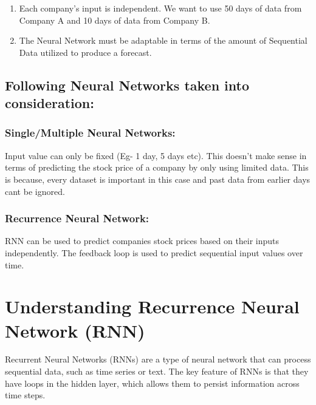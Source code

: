\documentclass[
]{article}
\providecommand{\tightlist}{%
  \setlength{\itemsep}{0pt}\setlength{\parskip}{0pt}}
\begin{document}
\begin{enumerate}
\def\labelenumi{\arabic{enumi}.}
\tightlist
\item
  Each company's input is independent. We want to use 50 days of data
  from Company A and 10 days of data from Company B.
\item
  The Neural Network must be adaptable in terms of the amount of
  Sequential Data utilized to produce a forecast.
\end{enumerate}

\hypertarget{following-neural-networks-taken-into-consideration}{%
\subsection{Following Neural Networks taken into
consideration:}\label{following-neural-networks-taken-into-consideration}}

\hypertarget{singlemultiple-neural-networks}{%
\subsubsection{Single/Multiple Neural
Networks:}\label{singlemultiple-neural-networks}}

Input value can only be fixed (Eg- 1 day, 5 days etc). This doesn't make
sense in terms of predicting the stock price of a company by only using
limited data. This is because, every dataset is important in this case
and past data from earlier days cant be ignored.

\hypertarget{recurrence-neural-network}{%
\subsubsection{Recurrence Neural
Network:}\label{recurrence-neural-network}}

RNN can be used to predict companies stock prices based on their inputs
independently. The feedback loop is used to predict sequential input
values over time.

\hypertarget{understanding-recurrence-neural-network-rnn}{%
\section{Understanding Recurrence Neural Network
(RNN)}\label{understanding-recurrence-neural-network-rnn}}

Recurrent Neural Networks (RNNs) are a type of neural network that can
process sequential data, such as time series or text. The key feature of
RNNs is that they have loops in the hidden layer, which allows them to
persist information across time steps.
\end{document}
